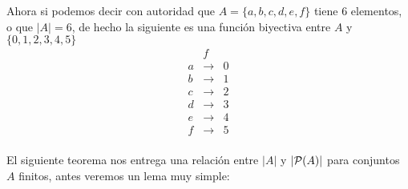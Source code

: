 \begin{ejemplo}
Ahora si podemos decir con autoridad que $A=\{a,b,c,d,e,f\}$ tiene $6$ elementos, o que $|A|=6$, de hecho la siguiente es una función biyectiva entre $A$ y $\{0,1,2,3,4,5\}$
\[
\begin{array}{ccc}
&f\\
a&\rightarrow&0\\
b&\rightarrow&1\\
c&\rightarrow&2\\
d&\rightarrow&3\\
e&\rightarrow&4\\
f&\rightarrow&5\\
\end{array}
\]
\end{ejemplo}

El siguiente teorema nos entrega una relación entre $|A|$ y $|\P(A)|$ para conjuntos $A$ finitos, antes veremos un lema muy simple:

